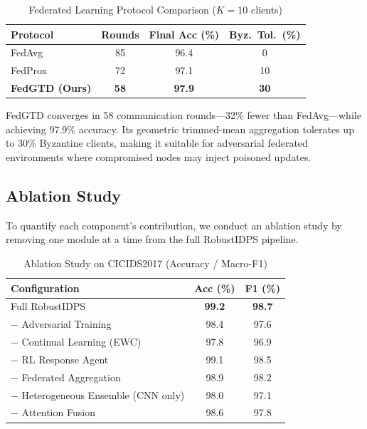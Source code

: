 \begin{table}[!t]
\centering
\caption{Federated Learning Protocol Comparison ($K{=}10$ clients)}
\label{tab:federated}
\renewcommand{\arraystretch}{1.15}
\begin{tabular}{@{}lccc@{}}
\toprule
\textbf{Protocol} & \textbf{Rounds} & \textbf{Final Acc (\%)} & \textbf{Byz.\ Tol.\ (\%)} \\
\midrule
FedAvg~\cite{McMahan2017}   & 85  & 96.4 & 0 \\
FedProx~\cite{Li2020FedProx} & 72  & 97.1 & 10 \\
\textbf{FedGTD (Ours)}       & \textbf{58} & \textbf{97.9} & \textbf{30} \\
\bottomrule
\end{tabular}
\end{table}

FedGTD converges in 58 communication rounds---32\% fewer than FedAvg---while achieving 97.9\% accuracy. Its geometric trimmed-mean aggregation tolerates up to 30\% Byzantine clients, making it suitable for adversarial federated environments where compromised nodes may inject poisoned updates.

\subsection{Ablation Study}

To quantify each component's contribution, we conduct an ablation study by removing one module at a time from the full RobustIDPS pipeline.

\begin{table}[!t]
\centering
\caption{Ablation Study on CICIDS2017 (Accuracy / Macro-F1)}
\label{tab:ablation}
\renewcommand{\arraystretch}{1.15}
\begin{tabular}{@{}lcc@{}}
\toprule
\textbf{Configuration} & \textbf{Acc (\%)} & \textbf{F1 (\%)} \\
\midrule
Full RobustIDPS                    & \textbf{99.2} & \textbf{98.7} \\
\midrule
$-$ Adversarial Training           & 98.4 & 97.6 \\
$-$ Continual Learning (EWC)       & 97.8 & 96.9 \\
$-$ RL Response Agent              & 99.1 & 98.5 \\
$-$ Federated Aggregation          & 98.9 & 98.2 \\
$-$ Heterogeneous Ensemble (CNN only) & 98.0 & 97.1 \\
$-$ Attention Fusion               & 98.6 & 97.8 \\
\bottomrule
\end{tabular}
\end{table}

